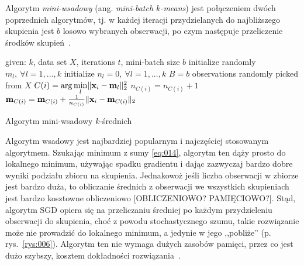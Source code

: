 \documentclass{praca1}
\DeclarePairedDelimiter{\norm}{\lVert}{\rVert}
\begin{document}
Algorytm \emph{mini-wsadowy} (ang. \emph{mini-batch $k$-means}) jest połączeniem dwóch poprzednich algorytmów, tj. w każdej iteracji przydzielanych do najbliższego skupienia jest $b$ losowo wybranych obserwacji, po czym następuje przeliczenie środków skupień~\cite{Sculley2010:webkmeans}.

\begin{algorithm}[h!]
\begin{algorithmic}[1]
		\State given: $k$, data set $X$, iterations $t$, mini-batch size $b$
        \State initialize randomly $m_l, \ \forall l=1, ..., k$
        \State initialize $n_l = 0, \ \forall l=1, ..., k$
        	\State $B = b$ observations randomly picked from $X$
                \State $C(i) = \arg \min\limits_{l} \norm{\mathbf{x}_i - \mathbf{m}_l }_2^2 $
            \EndFor
                \State $n_{C(i)} = n_{C(i)} + 1$
                \State $\mathbf{m}_{C(i)} = \mathbf{m}_{C(i)} + \frac{1}{n_{C(i)}}\norm{\mathbf{x}_i - \mathbf{m}_{C(i)}}_2$
            \EndFor
       \EndFor
\end{algorithmic}
\caption{Algorytm mini-wsadowy $k$-średnich}\label{alg:003}
\end{algorithm}


Algorytm wsadowy jest najbardziej popularnym i najczęściej stosowanym algorytmem. Szukając minimum z sumy \ref{eq:014}, algorytm ten 
dąży prosto do lokalnego minimum, używając spadku gradientu i dając zazwyczaj bardzo dobre wyniki podziału zbioru na skupienia. Jednakowoż jeśli liczba obserwacji w zbiorze jest bardzo duża, to obliczanie średnich z obserwacji we wszystkich skupieniach jest bardzo kosztowne obliczeniowo [OBLICZENIOWO? PAMIĘCIOWO?]. Stąd, algorytm SGD opiera się na przeliczaniu średniej po każdym przydzieleniu obserwacji do skupienia, choć z powodu stochastycznego szumu, takie rozwiązanie może nie prowadzić do lokalnego minimum, a jedynie w jego ,,pobliże'' (p. rys.~\ref{rys:006}). Algorytm ten nie wymaga dużych zasobów pamięci, przez co jest dużo szybszy, kosztem dokładności rozwiązania~\cite{}. 
\end{document}
